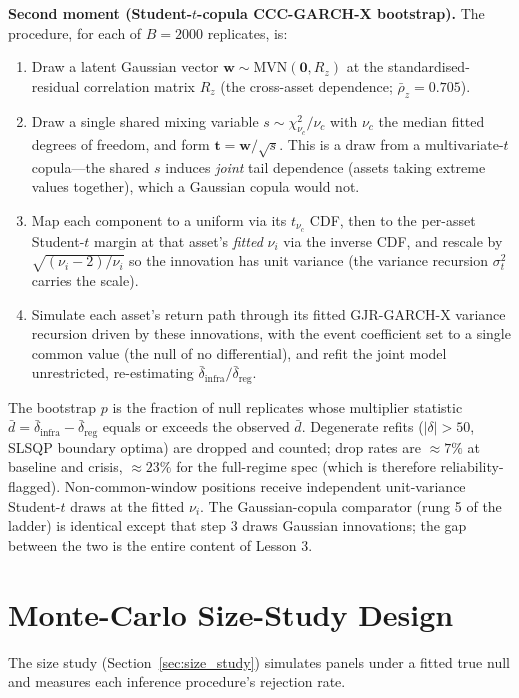 \documentclass[pdflatex,sn-mathphys-num]{sn-jnl}
\theoremstyle{thmstyleone}
\theoremstyle{thmstyletwo}
\theoremstyle{thmstylethree}
\begin{document}
\begin{appendices}
\textbf{Second moment (Student-$t$-copula CCC-GARCH-X bootstrap).} The procedure, for each of $B=2000$ replicates, is:
\begin{enumerate}[leftmargin=1.4em,itemsep=2pt]
\item Draw a latent Gaussian vector $\mathbf{w}\sim\mathrm{MVN}(\mathbf{0}, R_z)$ at the standardised-residual correlation matrix $R_z$ (the cross-asset dependence; $\bar\rho_z=0.705$).
\item Draw a single shared mixing variable $s\sim\chi^2_{\nu_c}/\nu_c$ with $\nu_c$ the median fitted degrees of freedom, and form $\mathbf{t}=\mathbf{w}/\sqrt{s}$. This is a draw from a multivariate-$t$ copula---the shared $s$ induces \emph{joint} tail dependence (assets taking extreme values together), which a Gaussian copula would not.
\item Map each component to a uniform via its $t_{\nu_c}$ CDF, then to the per-asset Student-$t$ margin at that asset's \emph{fitted} $\nu_i$ via the inverse CDF, and rescale by $\sqrt{(\nu_i-2)/\nu_i}$ so the innovation has unit variance (the variance recursion $\sigma^2_t$ carries the scale).
\item Simulate each asset's return path through its fitted GJR-GARCH-X variance recursion driven by these innovations, with the event coefficient set to a single common value (the null of no differential), and refit the joint model unrestricted, re-estimating $\bar\delta_{\text{infra}}/\bar\delta_{\text{reg}}$.
\end{enumerate}
The bootstrap $p$ is the fraction of null replicates whose multiplier statistic $\bar d=\bar\delta_{\text{infra}}-\bar\delta_{\text{reg}}$ equals or exceeds the observed $\bar d$. Degenerate refits ($|\delta|>50$, SLSQP boundary optima) are dropped and counted; drop rates are $\approx 7\%$ at baseline and crisis, $\approx 23\%$ for the full-regime spec (which is therefore reliability-flagged). Non-common-window positions receive independent unit-variance Student-$t$ draws at the fitted $\nu_i$. The Gaussian-copula comparator (rung 5 of the ladder) is identical except that step 3 draws Gaussian innovations; the gap between the two is the entire content of Lesson 3.

\section{Monte-Carlo Size-Study Design}\label{app:size_study}

The size study (Section~\ref{sec:size_study}) simulates panels under a fitted true null and measures each inference procedure's rejection rate.


\end{appendices}
\end{document}
